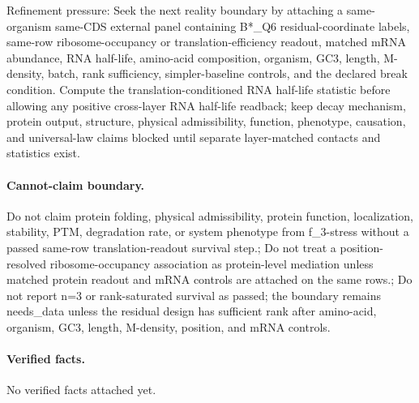 Refinement pressure: Seek the next reality boundary by attaching a same-organism same-CDS external panel containing B*\_Q6 residual-coordinate labels, same-row ribosome-occupancy or translation-efficiency readout, matched mRNA abundance, RNA half-life, amino-acid composition, organism, GC3, length, M-density, batch, rank sufficiency, simpler-baseline controls, and the declared break condition. Compute the translation-conditioned RNA half-life statistic before allowing any positive cross-layer RNA half-life readback; keep decay mechanism, protein output, structure, physical admissibility, function, phenotype, causation, and universal-law claims blocked until separate layer-matched contacts and statistics exist.

\paragraph{Cannot-claim boundary.} Do not claim protein folding, physical admissibility, protein function, localization, stability, PTM, degradation rate, or system phenotype from f\_3-stress without a passed same-row translation-readout survival step.; Do not treat a position-resolved ribosome-occupancy association as protein-level mediation unless matched protein readout and mRNA controls are attached on the same rows.; Do not report n=3 or rank-saturated survival as passed; the boundary remains needs\_data unless the residual design has sufficient rank after amino-acid, organism, GC3, length, M-density, position, and mRNA controls.

\paragraph{Verified facts.}
No verified facts attached yet.
